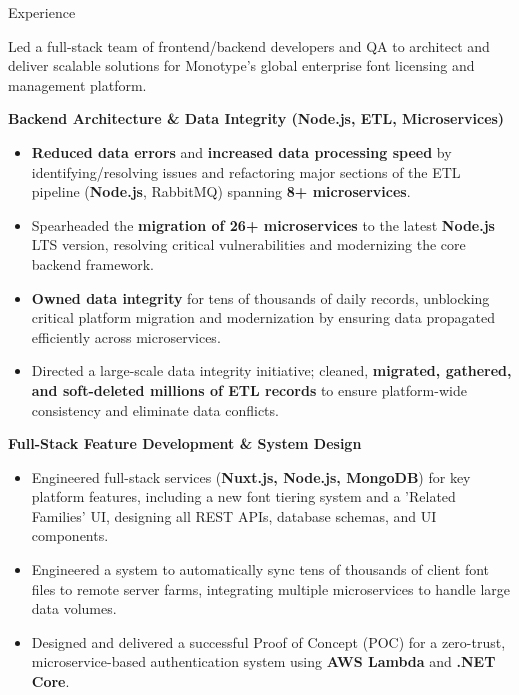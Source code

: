 \documentclass{resume} %
\begin{document}
\begin{rSection}{Experience}

Led a full-stack team of frontend/backend developers and QA to architect and deliver scalable solutions for Monotype's global enterprise font licensing and management platform.

\vspace{5pt}
\noindent\textbf{Backend Architecture \& Data Integrity (Node.js, ETL, Microservices)}
\begin{itemize}
    \item \textbf{Reduced data errors} and \textbf{increased data processing speed} by identifying/resolving issues and refactoring major sections of the ETL pipeline (\textbf{Node.js}, RabbitMQ) spanning \textbf{8+ microservices}.
    \item Spearheaded the \textbf{migration of 26+ microservices} to the latest \textbf{Node.js} LTS version, resolving critical vulnerabilities and modernizing the core backend framework.
    \item \textbf{Owned data integrity} for tens of thousands of daily records, unblocking critical platform migration and modernization by ensuring data propagated efficiently across microservices.
    \item Directed a large-scale data integrity initiative; cleaned, \textbf{migrated, gathered, and soft-deleted millions of ETL records} to ensure platform-wide consistency and eliminate data conflicts.
\end{itemize}

\vspace{5pt}
\noindent\textbf{Full-Stack Feature Development \& System Design}
\begin{itemize}
    \item Engineered full-stack services (\textbf{Nuxt.js, Node.js, MongoDB}) for key platform features, including a new font tiering system and a 'Related Families' UI, designing all REST APIs, database schemas, and UI components.
    \item Engineered a system to automatically sync tens of thousands of client font files to remote server farms, integrating multiple microservices to handle large data volumes.
    \item Designed and delivered a successful Proof of Concept (POC) for a zero-trust, microservice-based authentication system using \textbf{AWS Lambda} and \textbf{.NET Core}.
\end{itemize}


\end{rSection}
\end{document}
